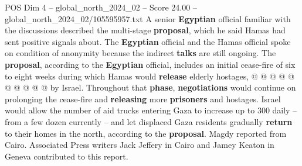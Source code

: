 \begin{textsample}{POS Dim 4 – global\_north\_2024\_02 – Score 24.00 – global\_north\_2024\_02/105595957.txt}
A senior \textbf{Egyptian} official familiar with the discussions described the multi-stage \textbf{proposal}, which he said Hamas had sent positive signals about.
The \textbf{Egyptian} official and the Hamas official spoke on condition of anonymity because the indirect \textbf{talks} are still ongoing.
The \textbf{proposal}, according to the \textbf{Egyptian} official, includes an initial cease-fire of six to eight weeks during which Hamas would \textbf{release} elderly hostages, @ @ @ @ @ @ @ @ @ @ by Israel.
Throughout that \textbf{phase}, \textbf{negotiations} would continue on prolonging the cease-fire and \textbf{releasing} more \textbf{prisoners} and hostages.
Israel would allow the number of aid trucks entering Gaza to increase up to 300 daily -- from a few dozen currently -- and let displaced Gaza residents gradually \textbf{return} to their homes in the north, according to the \textbf{proposal}.
Magdy reported from Cairo.
Associated Press writers Jack Jeffery in Cairo and Jamey Keaton in Geneva contributed to this report.

\end{textsample}

